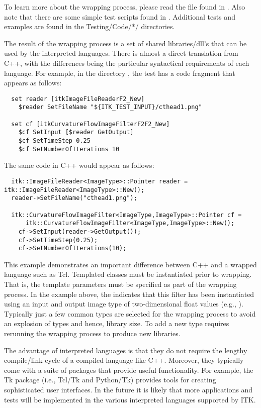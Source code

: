 To learn more about the wrapping process, please read the file found in
. Also note that there are some simple test
scripts found in . Additional tests and examples
are found in the {Testing/Code/*/} directories.

The result of the wrapping process is a set of shared libraries/dll's that
can be used by the interpreted languages. There is almost a direct
translation from C++, with the differences being the particular syntactical
requirements of each language. For example, in the directory
, the test
 has a code fragment that appears as
follows: 
\small
\begin{verbatim}
  set reader [itkImageFileReaderF2_New]
    $reader SetFileName "${ITK_TEST_INPUT}/cthead1.png"

  set cf [itkCurvatureFlowImageFilterF2F2_New]
    $cf SetInput [$reader GetOutput]
    $cf SetTimeStep 0.25
    $cf SetNumberOfIterations 10
\end{verbatim}
\normalsize
The same code in C++ would appear as follows:

\small
\begin{verbatim}
  itk::ImageFileReader<ImageType>::Pointer reader = itk::ImageFileReader<ImageType>::New();
  reader->SetFileName("cthead1.png");

  itk::CurvatureFlowImageFilter<ImageType,ImageType>::Pointer cf =
      itk::CurvatureFlowImageFilter<ImageType,ImageType>::New();
    cf->SetInput(reader->GetOutput());
    cf->SetTimeStep(0.25);
    cf->SetNumberOfIterations(10);
\end{verbatim}
\normalsize

This example demonstrates an important difference between C++ and a wrapped
language such as Tcl.  Templated classes must be instantiated prior to
wrapping. That is, the template parameters must be specified as part of the
wrapping process. In the example above, the
 indicates that this filter has been
instantiated using an input and output image type of two-dimensional float
values (e.g., ). Typically just a few common types are selected for
the wrapping process to avoid an explosion of types and hence, library
size. To add a new type requires rerunning the wrapping process to produce
new libraries.

The advantage of interpreted languages is that they do not require the
lengthy compile/link cycle of a compiled language like C++. Moreover, they
typically come with a suite of packages that provide useful
functionality. For example, the Tk package (i.e., Tcl/Tk and Python/Tk)
provides tools for creating sophisticated user interfaces. In the future it
is likely that more applications and tests will be implemented in the various
interpreted languages supported by ITK.


%
%
%
